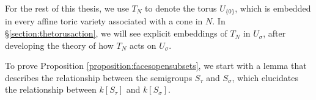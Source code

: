 \documentclass[12pt]{amsart}
\theoremstyle{plain}
\begin{document}

For the rest of this thesis, we use $T_N$ to denote the torus $U_{\{0\}}$, which is embedded in every affine toric variety associated with a cone in $N$.
In \S \ref{section:thetorusaction}, we will see explicit embeddings of $T_N$ in $U_\sigma$, after developing the theory of how $T_N$ acts on $U_\sigma$.

To prove Proposition \ref{proposition:facesopensubsets}, we start with a lemma that describes the relationship between the semigroups $S_\tau$ and $S_\sigma$, which elucidates the relationship between $k[S_\tau]$ and $k[S_\sigma]$.
\end{document}
